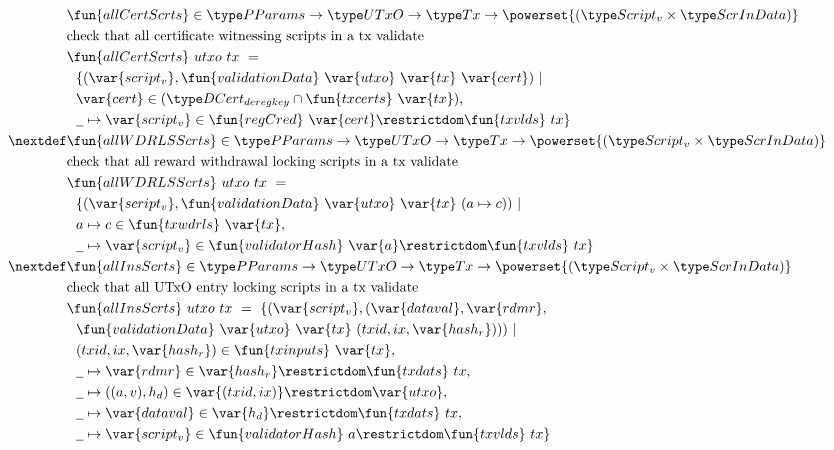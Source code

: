 \begin{figure}[htb]
  \begin{align*}
    & \fun{allCertScrts} \in \PParams \to \UTxO \to \Tx \to \powerset{(\ScriptV \times \ScrInData)} \\
    & \text{check that all certificate witnessing scripts in a tx validate} \\
    & \fun{allCertScrts}~{utxo}~{tx}~=~ \\
    & ~~\{ (\var{script_v},
    \fun{validationData}~\var{utxo}~\var{tx}~\var{cert}) ~\vert \\
    & ~~\var{cert} \in (\DCertDeRegKey\cap\fun{txcerts}~\var{tx}), \\
    &~~\wcard\mapsto \var{script_v}\in \fun{regCred}~\var{cert}\restrictdom\fun{txvlds}~{tx}
     \} \\
    \nextdef
    & \fun{allWDRLSScrts} \in \PParams \to \UTxO \to \Tx \to \powerset{(\ScriptV\times\ScrInData)} \\
    & \text{check that all reward withdrawal locking scripts in a tx validate} \\
    & \fun{allWDRLSScrts}~{utxo}~{tx}~=~ \\
    & ~~\{ (\var{script_v},\fun{validationData}~\var{utxo}~\var{tx}~
      (a\mapsto c)) ~\vert \\
    & ~~a \mapsto c \in\fun{txwdrls}~\var{tx}, \\
    & ~~\wcard\mapsto \var{script_v}\in \fun{validatorHash}~\var{a}\restrictdom\fun{txvlds}~{tx}\}\\
    \nextdef
    & \fun{allInsScrts} \in \PParams \to \UTxO \to \Tx \to \powerset{(\ScriptV\times\ScrInData)} \\
    & \text{check that all UTxO entry locking scripts in a tx validate} \\
    & \fun{allInsScrts}~{utxo}~{tx}~=~ \{ (\var{script_v}, (\var{dataval},\var{rdmr}, \\
    & ~~ \fun{validationData}~\var{utxo}~\var{tx}~
      (txid,ix,\var{hash_r}))) ~\vert \\
    & ~~(txid,ix,\var{hash_r}) \in \fun{txinputs}~\var{tx}, \\
    & ~~\wcard \mapsto \var{rdmr} \in \var{hash_r}\restrictdom \fun{txdats}~{tx}, \\
    & ~~\wcard \mapsto ((a,v),h_d) \in \var{(txid,ix)}\restrictdom\var{utxo}, \\
    & ~~\wcard \mapsto \var{dataval} \in \var{h_d}\restrictdom \fun{txdats}~{tx}, \\
    & ~~\wcard\mapsto \var{script_v}\in \fun{validatorHash}~{a}\restrictdom\fun{txvlds}~{tx} \}\\

\end{align*}
\end{figure}
